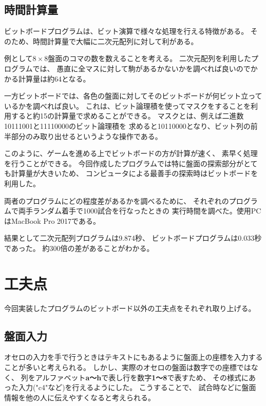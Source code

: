 \documentclass{jsarticle}
\begin{document}
    \subsection{時間計算量}
        ビットボードプログラムは、ビット演算で様々な処理を行える特徴がある。
        そのため、時間計算量で大幅に二次元配列に対して利がある。
        
        例として$8 \times 8$盤面のコマの数を数えることを考える。
        二次元配列を利用したプログラムでは、
        愚直に全マスに対して駒があるかないかを調べれば良いのでかかる計算量は約64となる。

        一方ビットボードでは、各色の盤面に対してそのビットボードが何ビット立っているかを調べれば良い。
        これは、ビット論理積を使ってマスクをすることを利用すると約15の計算量で求めることができる。
        マスクとは、例えば二進数10111001と11110000のビット論理積を
        求めると10110000となり、ビット列の前半部分のみ取り出せるというような操作である。

        このように、ゲームを進める上でビットボードの方が計算が速く、
        素早く処理を行うことができる。
        今回作成したプログラムでは特に盤面の探索部分がとても計算量が大きいため、
        コンピュータによる最善手の探索時はビットボードを利用した。

        両者のプログラムにどの程度差があるかを調べるために、
        それぞれのプログラムで両手ランダム着手で1000試合を行なったときの
        実行時間を調べた。使用PCはMacBook Pro 2017である。

        結果として二次元配列プログラムは9.874秒、
        ビットボードプログラムは0.033秒であった。
        約300倍の差があることがわかる。

\section{工夫点}
    今回実装したプログラムのビットボード以外の工夫点をそれぞれ取り上げる。

    \subsection{盤面入力}
        オセロの入力を手で行うときはテキストにもあるように盤面上の座標を入力することが多いと考えられる。
        しかし、実際のオセロの盤面は数字での座標ではなく、
        列をアルファベット{\bf a〜h}で表し行を数字{\bf1〜8}で表すため、
        その様式にあった入力("c4"など)を行えるようにした。
        こうすることで、
        試合時などに盤面情報を他の人に伝えやすくなると考えられる。
\end{document}
